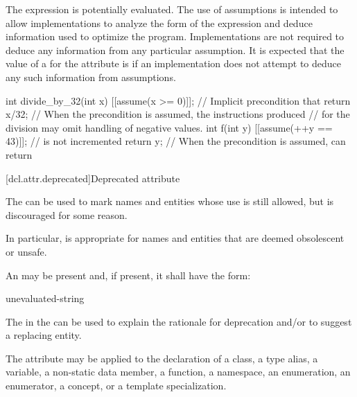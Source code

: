 \pnum
\begin{note}
The expression is potentially evaluated.
The use of assumptions is intended to allow implementations
to analyze the form of the expression and
deduce information used to optimize the program.
Implementations are not required to deduce
any information from any particular assumption.
It is expected that the value of
a  for the  attribute
is 
if an implementation does not attempt to deduce
any such information from assumptions.
\end{note}

\pnum
\begin{example}
\begin{codeblock}
int divide_by_32(int x) {
  [[assume(x >= 0)]];       // Implicit precondition that 
  return x/32;              // When the precondition is assumed, the instructions produced
                            // for the division may omit handling of negative values.
}
int f(int y) {
  [[assume(++y == 43)]];    //  is not incremented
  return y;                 // When the precondition is assumed, can return 
}
\end{codeblock}
\end{example}

[dcl.attr.deprecated]{Deprecated attribute}%

\pnum
The   can be used to mark names and entities
whose use is still allowed, but is discouraged for some reason.
\begin{note}
In particular,
 is appropriate for names and entities that are deemed obsolescent or
unsafe.
\end{note}
An
 may be present and, if present, it shall have the form:
\begin{ncbnf}
\terminal{(} unevaluated-string \terminal{)}
\end{ncbnf}
\begin{note}
The  in the 
can be used to explain the rationale for deprecation and/or to suggest a replacing entity.
\end{note}

\pnum
The attribute may be applied to the declaration of
a class,
a type alias,
a variable,
a non-static data member,
a function,
a namespace,
an enumeration,
an enumerator,
a concept, or
a template specialization.

